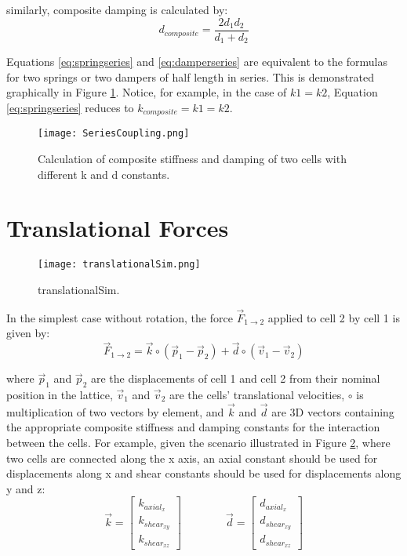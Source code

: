 {similarly, composite damping is calculated by:
 \begin{equation} \label{eq:damperseries}
d_{composite} = \dfrac{2d_1d_2}{d_1+d_2}
 \end{equation}
 
 Equations \ref{eq:springseries} and \ref{eq:damperseries} are equivalent to the formulas for two springs or two dampers of half length in series.  This is demonstrated graphically in Figure \ref{fig:SeriesCoupling}.  Notice, for example, in the case of $k1=k2$, Equation \ref{eq:springseries} reduces to $ k_{composite} = k1 = k2$.\\
 
 \begin{figure}
  \texttt{[image: SeriesCoupling.png]}
  \caption{Calculation of composite stiffness and damping of two cells with different k and d constants.}
  \label{fig:SeriesCoupling}
\end{figure}


\section{Translational Forces}

\begin{figure}
  \texttt{[image: translationalSim.png]}
  \caption{translationalSim.}
  \label{fig:translationalSim}
\end{figure}

In the simplest case without rotation, the force $\vec{F}_{1 \rightarrow 2}$ applied to cell 2 by cell 1 is given by:
\begin{equation} \label{eq:translationalForce}
\vec{F}_{1\rightarrow2} = \vec{k} \circ (\vec{p}_1 - \vec{p}_2) + \vec{d} \circ (\vec{v}_1 - \vec{v}_2)
\end{equation}

where $\vec{p}_1$ and $\vec{p}_2$ are the displacements of cell 1 and cell 2 from their nominal position in the lattice, $\vec{v}_1$ and $\vec{v}_2$ are the cells' translational velocities, $\circ$ is multiplication of two vectors by element, and $\vec{k}$ and $\vec{d}$ are 3D vectors containing the appropriate composite stiffness and damping constants for the interaction between the cells.  For example, given the scenario illustrated in Figure \ref{fig:translationalSim}, where two cells are connected along the x axis, an axial constant should be used for displacements along x and shear constants should be used for displacements along y and z:
\[ \vec{k} =  \left[ \begin{array}{ccc}
k_{axial_x}\\
k_{shear_{xy}}\\
k_{shear_{xz}}
 \end{array} \right]  
  \qquad\qquad
  \vec{d} =  \left[ \begin{array}{ccc}
d_{axial_x}\\
d_{shear_{xy}}\\
d_{shear_{xz}}
 \end{array} \right] \] 
 
}
